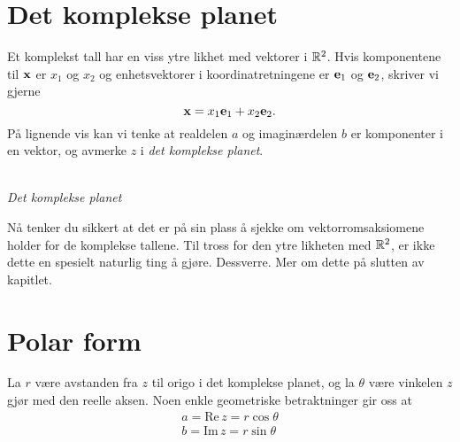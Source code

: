 \section*{Det komplekse planet}

Et komplekst tall har en viss ytre likhet med vektorer i $\mathbb{R}^2$. Hvis komponentene til $\mathbf{x}$ er $x_1$ og $x_2$ og enhetsvektorer i koordinatretningene er $\mathbf{e}_1$ og $\mathbf{e}_2$, skriver vi gjerne
\[
\mathbf{x}=x_1 \mathbf{e}_1+x_2 \mathbf{e}_2.
\]
På lignende vis kan vi tenke at realdelen $a$ og imaginærdelen $b$ er komponenter i en vektor, og avmerke $z$ i \emph{det komplekse planet}.
\begin{center}
\\
{\small \textit{Det komplekse planet}}
\end{center}
Nå tenker du sikkert at det er på sin plass å sjekke om vektorromsaksiomene holder for de komplekse tallene. Til tross for den ytre likheten med $\mathbb{R}^2$, er ikke dette en spesielt naturlig ting å gjøre. Dessverre. Mer om dette på slutten av kapitlet. 

\section*{Polar form}
La $r$ være avstanden fra $z$ til origo i det komplekse planet, og la $\theta$ være vinkelen $z$ gjør med den reelle aksen. Noen enkle geometriske betraktninger gir oss at 
\begin{align*}
a=\text{Re}\, z = r\cos \theta \\
b=\text{Im}\, z = r\sin \theta \\
\end{align*}

